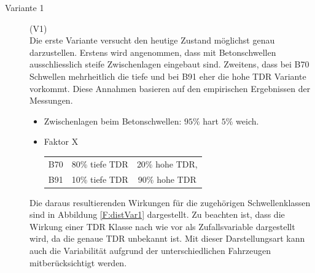 \begin{description}
\item[Variante 1] (V1) \\
	Die erste Variante versucht den heutige Zustand möglichst genau darzustellen. Erstens wird angenommen, dass mit Betonschwellen ausschliesslich  steife Zwischenlagen eingebaut sind. Zweitens, dass bei B70 Schwellen mehrheitlich die tiefe und bei B91 eher die hohe TDR Variante vorkommt. Diese Annahmen basieren auf den empirischen Ergebnissen der Messungen.\\
	\begin{itemize}
	\item 	Zwischenlagen beim  Betonschwellen: $95\%$ hart $5\%$ weich.
	\item Faktor X\\
		\begin{tabular}[h]{rcc}
		  B70 & 80\% tiefe TDR & 20\% hohe  TDR,\\
		  B91 & 10\% tiefe TDR & 90\% hohe TDR
		\end{tabular}
	\end{itemize}
	Die daraus resultierenden Wirkungen für die zugehörigen Schwellenklassen sind in Abbildung \ref{F:distVar1} dargestellt. Zu beachten ist, dass die Wirkung einer TDR Klasse nach wie vor als Zufallsvariable dargestellt wird, da die genaue TDR  unbekannt ist. Mit dieser Darstellungsart kann auch die Variabilität aufgrund der unterschiedlichen Fahrzeugen mitberücksichtigt werden.


\end{description}
